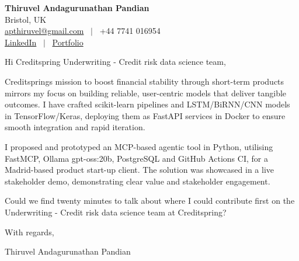 \documentclass[11pt,a4paper]{article}
\begin{document}
\raggedright
\pagestyle{empty}

\begin{center}
    {\LARGE \color{linkblue} \textbf{Thiruvel Andagurunathan Pandian}}\\[0.2cm]
    Bristol, UK \\
    \href{mailto:apthiruvel@gmail.com}{apthiruvel@gmail.com} \ $|$ \ +44 7741 016954 \\
\href{https://www.linkedin.com/in/thiruvel-a-p/}{LinkedIn} \ $|$ \ \href{https://thiruvel-ap.github.io/PersonalPortfolio/}{Portfolio}
\end{center}

\vspace{0.4cm}

\noindent
Hi Creditspring Underwriting - Credit risk data science team,

Creditspring\textquotesingle{}s mission to boost financial stability through short-term products mirrors my focus on building reliable, user-centric models that deliver tangible outcomes. I have crafted scikit-learn pipelines and LSTM/BiRNN/CNN models in TensorFlow/Keras, deploying them as FastAPI services in Docker to ensure smooth integration and rapid iteration.

I proposed and prototyped an MCP-based agentic tool in Python, utilising FastMCP, Ollama gpt-oss:20b, PostgreSQL and GitHub Actions CI, for a Madrid-based product start-up client. The solution was showcased in a live stakeholder demo, demonstrating clear value and stakeholder engagement.

Could we find twenty minutes to talk about where I could contribute first on the Underwriting - Credit risk data science team at Creditspring?

\vspace{0.5cm}

With regards,

Thiruvel Andagurunathan Pandian
\end{document}
